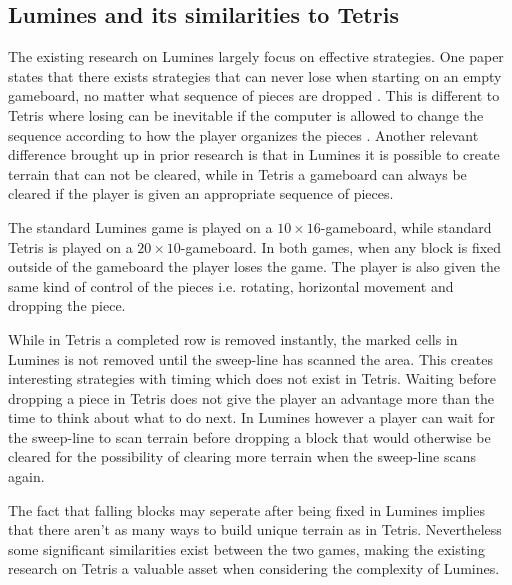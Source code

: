 \subsection{Lumines and its similarities to Tetris}
\label{subsub:sim}

The existing research on Lumines largely focus on effective strategies. One paper states that there exists strategies that can never lose when starting on an empty gameboard, no matter what sequence of pieces are dropped \cite{lumines}. This is different to Tetris where losing can be inevitable if the computer is allowed to change the sequence according to how the player organizes the pieces \cite[p. 4]{tetris}. Another relevant difference brought up in prior research is that in Lumines it is possible to create terrain that can not be cleared, while in Tetris a gameboard can always be cleared if the player is given an appropriate sequence of pieces.

The standard Lumines game is played on a $10 \times 16$-gameboard, while standard Tetris is played on a $20 \times 10$-gameboard. In both games, when any block is fixed outside of the gameboard the player loses the game. The player is also given the same kind of control of the pieces i.e. rotating, horizontal movement and dropping the piece.

While in Tetris a completed row is removed instantly, the marked cells in Lumines is not removed until the sweep-line has scanned the area. This creates interesting strategies with timing which does not exist in Tetris. Waiting before dropping a piece in Tetris does not give the player an advantage more than the time to think about what to do next. In Lumines however a player can wait for the sweep-line to scan terrain before dropping a block that would otherwise be cleared for the possibility of clearing more terrain when the sweep-line scans again.

The fact that falling blocks may seperate after being fixed in Lumines implies that there aren't as many ways to build unique terrain as in Tetris. Nevertheless some significant similarities exist between the two games, making the existing research on Tetris a valuable asset when considering the complexity of Lumines.
